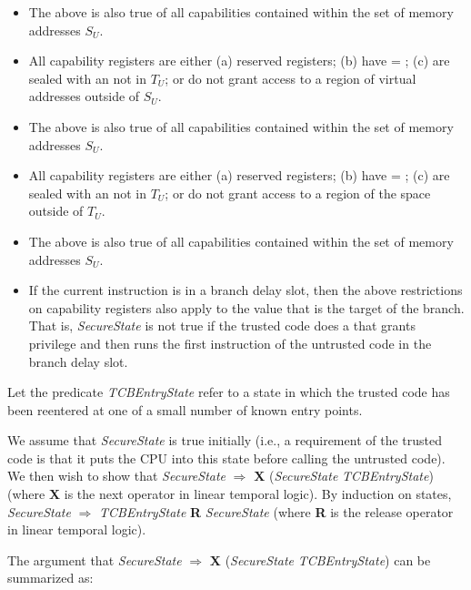 \begin{itemize}
\item
The above is also true of all capabilities contained within the set of memory
addresses $S_U$.
\item
All capability registers are either (a) reserved registers; (b) have \ctag{} =
\algorithmicfalse{}; (c) are sealed with an \cotype{} not in $T_U$; or do not
grant access to a region of virtual addresses outside of $S_U$.
\item
The above is also true of all capabilities contained within the set of memory
addresses $S_U$.
\item
All capability registers are either (a) reserved registers; (b) have \ctag{} =
\algorithmicfalse{}; (c) are sealed with an \cotype{} not in $T_U$; or do not
grant access to a region of the \cotype{} space outside of $T_U$.
\item
The above is also true of all capabilities contained within the set of memory
addresses $S_U$.
\item
If the current instruction is in a branch delay slot, then the above restrictions
on capability registers also apply to the \PCC{} value that is the target of the
branch. That is, \emph{SecureState} is not true if the trusted code does a
 that grants privilege and then runs the first instruction of
the untrusted code in the branch delay slot.
\end{itemize}

Let the predicate \emph{TCBEntryState} refer to a state in which the trusted code
has been reentered at one of a small number of known entry points.

We assume that \emph{SecureState} is true initially (i.e.,
a requirement of
the trusted code is that it puts the CPU into this state before calling the
untrusted code).
We then wish to show that \emph{SecureState} $\Rightarrow$ \textbf{X}
 (\emph{SecureState} \algorithmicor{} \emph{TCBEntryState}) (where \textbf{X} is
the next operator in linear temporal logic). By induction on states,
\emph{SecureState} $\Rightarrow$ \emph{TCBEntryState} \textbf{R} \emph{SecureState}
(where \textbf{R} is the release operator in linear temporal logic).

The argument that \emph{SecureState} $\Rightarrow$ \textbf{X} (\emph{SecureState}
\algorithmicor{} \emph{TCBEntryState}) can be summarized as:

